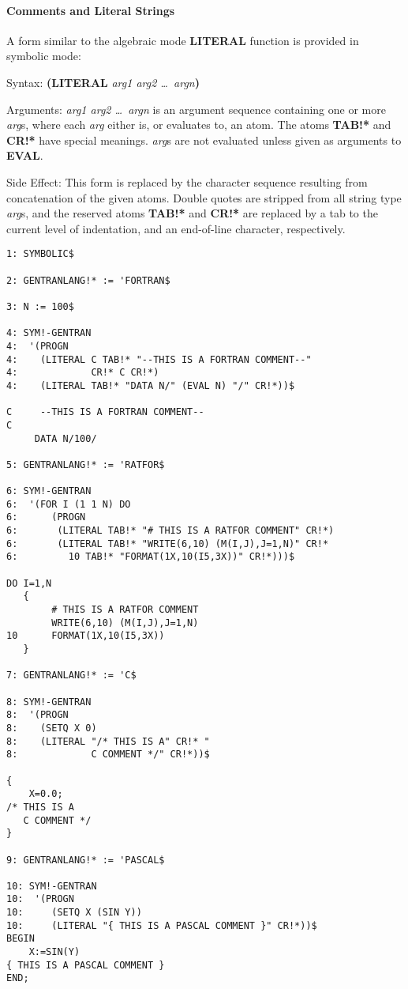 \paragraph{Comments and Literal Strings}
 
A form similar to the algebraic mode {\bf LITERAL} function is provided in
symbolic mode:
\begin{describe}{Syntax:}
{\bf (LITERAL} {\it arg1 arg2 \dots\  argn\/}{\bf )}
\end{describe}
\begin{describe}{Arguments:}
{\it arg1 arg2 \dots\  argn\/} is an argument sequence containing one or more
{\it arg\/}s, where each {\it arg\/} either is, or evaluates to, an atom.  The
atoms {\bf TAB!*} and {\bf CR!*} have special meanings. 
 {\it arg\/}s are
not evaluated unless given as arguments to {\bf EVAL}.
\end{describe}
\begin{describe}{Side Effect:}
This form is replaced by the character sequence resulting from
concatenation of the given atoms.  Double quotes are stripped from
all string type {\it arg\/}s, and the reserved atoms {\bf TAB!*}
and {\bf CR!*} are replaced by a tab to the current level of indentation,
and an end-of-line character, respectively.
\end{describe}
\begin{describe}{\example}
\begin{verbatim}
1: SYMBOLIC$

2: GENTRANLANG!* := 'FORTRAN$

3: N := 100$

4: SYM!-GENTRAN
4:  '(PROGN
4:    (LITERAL C TAB!* "--THIS IS A FORTRAN COMMENT--"
4:             CR!* C CR!*)
4:    (LITERAL TAB!* "DATA N/" (EVAL N) "/" CR!*))$

C     --THIS IS A FORTRAN COMMENT--
C
     DATA N/100/

5: GENTRANLANG!* := 'RATFOR$

6: SYM!-GENTRAN
6:  '(FOR I (1 1 N) DO
6:      (PROGN
6:       (LITERAL TAB!* "# THIS IS A RATFOR COMMENT" CR!*)
6:       (LITERAL TAB!* "WRITE(6,10) (M(I,J),J=1,N)" CR!*
6:         10 TAB!* "FORMAT(1X,10(I5,3X))" CR!*)))$

DO I=1,N
   {
        # THIS IS A RATFOR COMMENT
        WRITE(6,10) (M(I,J),J=1,N)
10      FORMAT(1X,10(I5,3X))
   }

7: GENTRANLANG!* := 'C$

8: SYM!-GENTRAN
8:  '(PROGN
8:    (SETQ X 0)
8:    (LITERAL "/* THIS IS A" CR!* "
8:             C COMMENT */" CR!*))$

{
    X=0.0;
/* THIS IS A
   C COMMENT */
}

9: GENTRANLANG!* := 'PASCAL$

10: SYM!-GENTRAN
10:  '(PROGN
10:     (SETQ X (SIN Y))
10:     (LITERAL "{ THIS IS A PASCAL COMMENT }" CR!*))$
BEGIN
    X:=SIN(Y)
{ THIS IS A PASCAL COMMENT }
END;

\end{verbatim}
\end{describe}


